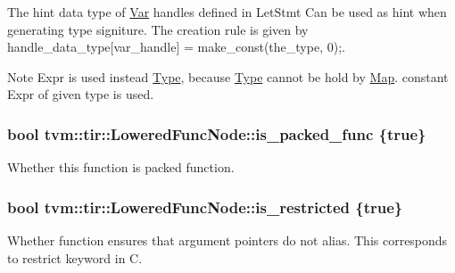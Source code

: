 The hint data type of \hyperlink{classtvm_1_1tir_1_1Var}{Var} handles defined in Let\+Stmt Can be used as hint when generating type signiture. The creation rule is given by handle\+\_\+data\+\_\+type\mbox{[}var\+\_\+handle\mbox{]} = make\+\_\+const(the\+\_\+type, 0);. 

\begin{DoxyNote}{Note}
Expr is used instead \hyperlink{classtvm_1_1Type}{Type}, because \hyperlink{classtvm_1_1Type}{Type} cannot be hold by \hyperlink{classtvm_1_1Map}{Map}. constant Expr of given type is used. 
\end{DoxyNote}
\subsubsection[{\texorpdfstring{is\+\_\+packed\+\_\+func}{is_packed_func}}]{\setlength{\rightskip}{0pt plus 5cm}bool tvm\+::tir\+::\+Lowered\+Func\+Node\+::is\+\_\+packed\+\_\+func \{true\}}\hypertarget{classtvm_1_1tir_1_1LoweredFuncNode_abfe5c1806998239b88c001e335200f82}{}\label{classtvm_1_1tir_1_1LoweredFuncNode_abfe5c1806998239b88c001e335200f82}


Whether this function is packed function. 

\subsubsection[{\texorpdfstring{is\+\_\+restricted}{is_restricted}}]{\setlength{\rightskip}{0pt plus 5cm}bool tvm\+::tir\+::\+Lowered\+Func\+Node\+::is\+\_\+restricted \{true\}}\hypertarget{classtvm_1_1tir_1_1LoweredFuncNode_af5b31c9e4cf7a0f2064385a93e19e816}{}\label{classtvm_1_1tir_1_1LoweredFuncNode_af5b31c9e4cf7a0f2064385a93e19e816}


Whether function ensures that argument pointers do not alias. This corresponds to restrict keyword in C. 


